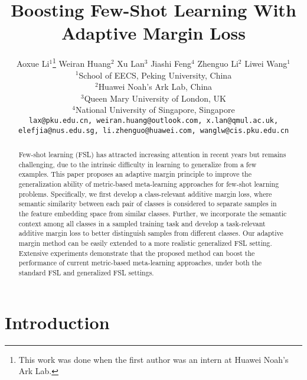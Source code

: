\documentclass[10pt,twocolumn,letterpaper]{article}
\begin{document}
\title{Boosting Few-Shot Learning With Adaptive Margin Loss}

\author{Aoxue Li$^{1}$\thanks{This work was done when the first author was an intern at Huawei Noah's Ark Lab.} \quad Weiran Huang$^{2}$ \quad Xu Lan$^{3}$ \quad Jiashi Feng$^{4}$ \quad Zhenguo Li$^{2}$ \quad Liwei Wang$^{1}$\vspace{0.5em}\\
  $^1$School of EECS, Peking University, China\\
  $^2$Huawei Noah's Ark Lab, China\\
  $^3$Queen Mary University of London, UK\\
  $^4$National University of Singapore, Singapore\\
  {\tt\small lax@pku.edu.cn, weiran.huang@outlook.com, x.lan@qmul.ac.uk,}\\ {\tt\small elefjia@nus.edu.sg, li.zhenguo@huawei.com, wanglw@cis.pku.edu.cn}
}


\maketitle
\thispagestyle{empty}

\begin{abstract}
Few-shot learning (FSL) has attracted increasing attention in recent years but remains challenging, due to the intrinsic difficulty in learning to generalize from a few examples. This paper proposes an adaptive margin principle to improve the generalization ability of metric-based meta-learning approaches for few-shot learning problems. Specifically, we first develop a class-relevant additive margin loss, where semantic similarity between each pair of classes is considered to separate samples in the feature embedding space from similar classes. Further, we incorporate the semantic context among all classes in a sampled training task and develop a task-relevant additive margin loss to better distinguish samples from different classes. Our adaptive margin method can be easily extended to a more realistic generalized FSL setting. Extensive experiments demonstrate that the proposed method can boost the performance of current metric-based meta-learning approaches, under both the standard FSL and generalized FSL settings.
\end{abstract}

\section{Introduction}
\end{document}
